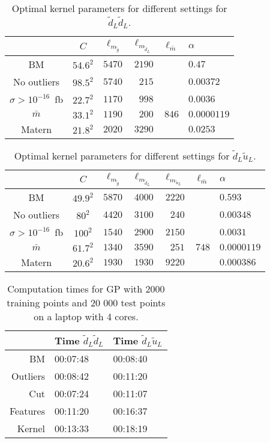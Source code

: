 \documentclass[twoside,english]{uiofysmaster}
\begin{document}
\begin{table}
\centering
\begin{tabular}{c|c|r|r|r|l}
 & $C$ & $\ell_{m_{\tilde{g}}}$ & $\ell_{m_{\tilde{d}_L}}$ & $\ell_{\bar{m}}$ & $\alpha$\\
 \hline
BM & $54.6^2$ & $5470 $& $ 2190$ & & $0.47$\\
No outliers & $98.5^2 $ & $5740$ & $215$ & & $0.00372$\\
$\sigma > 10^{-16}$~fb & $22.7^2$ & $1170$&  $998$ && $0.0036$\\
$\bar{m}$ & $33.1^2$ & $1190$ & $200$ & $846$ & $0.0000119$\\
Matern & $21.8^2$ & $2020$ & $3290$ && $0.0253$\\
\end{tabular}
\caption{Optimal kernel parameters for different settings for $\tilde{d}_L \tilde{d}_L$.}
\label{Tab:: evaluating cross : optimal kernels dLdL}
\end{table}

\begin{table}
\centering
\begin{tabular}{c|c|r|r|r|r|l}
 & $C$ & $\ell_{m_{\tilde{g}}}$ & $\ell_{m_{\tilde{d}_L}}$ & $\ell_{m_{\tilde{u}_L}}$ & $\ell_{\bar{m}}$ &$\alpha$\\
 \hline
BM & $49.9^2$ & $5870$&$ 4000$&$ 2220$ && $0.593$ \\
No outliers & $80^2$ & $4420$ & $3100$ & $240$ && $0.00348$\\ 
$\sigma > 10^{-16}$~fb & $100^2$ & $1540$ & $2900$ & $2150$ && $0.0031$\\
$\bar{m}$ &  $61.7^2$ & $1340$ & $3590$ & $251$ & $748$ & $0.0000119$\\
Matern & $20.6^2$ & $1930$ & $1930$ & $9220$ && $0.000386$\\
\end{tabular}
\caption{Optimal kernel parameters for different settings for $\tilde{d}_L \tilde{u}_L$.}
\label{Tab:: evaluating cross : optimal kernels dLuL}
\end{table}
 
\begin{table}
\centering
\begin{tabular}{r|l|l}
& Time $\tilde{d}_L \tilde{d}_L$ & Time $\tilde{d}_L \tilde{u}_L$\\
\hline
BM & 00:07:48 & 00:08:40\\
Outliers & 00:08:42 & 00:11:20\\
Cut & 00:07:24 & 00:11:07\\
Features & 00:11:20 & 00:16:37\\
Kernel & 00:13:33 & 00:18:19
\end{tabular}
\caption{Computation times for GP with 2000 training points and 20 000 test points on a laptop with 4 cores.}
\label{Tab:: evaluating cross : computation times BM}
\end{table}
\end{document}
